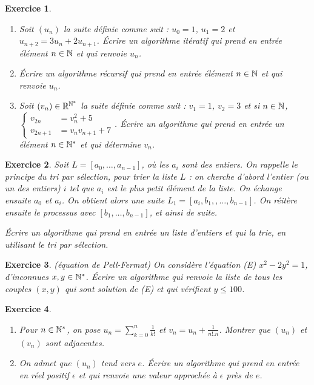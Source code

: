 \documentclass[11pt,a4paper]{article}
\newtheorem{ex}{Exercice}
\begin{document}
\begin{ex}\label{exSuite_recurrente}
\begin{enumerate}
\item Soit $(u_n)$ la suite définie comme suit : $u_0=1$, $u_1=2$ et $u_{n+2}=3u_n+2u_{n+1}$. Écrire un algorithme itératif qui prend en entrée élément $n\in \mathbb{N}$ et qui renvoie $u_n$.

\item Écrire un algorithme récursif qui prend en entrée élément $n\in \mathbb{N}$ et qui renvoie $u_n$.

\item Soit $(v_n)\in \mathbb{R}^{\mathbb{N}^*}$ la suite définie comme suit : $v_1=1$, $v_2=3$ et si $n\in \mathbb{N}$,  $\left\{\begin{aligned} v_{2n}&= v_n^2+5 \\
v_{2n+1}&= 
 v_n v_{n+1}+7 \end{aligned}\right.$. Écrire un algorithme qui prend en entrée un élément $n\in \mathbb{N}^*$ et qui  détermine $v_n$. 
\end{enumerate} 
\end{ex}

 

\begin{ex}\label{exTri_selection}
Soit $L=[a_0,\ldots,a_{n-1}]$, où les $a_i$ sont des entiers.  On rappelle le principe du tri par sélection, pour trier la liste $L$ : 
on cherche d'abord l'entier (ou un des entiers) $i$ tel que  $a_i$ est le plus petit élément de la liste. On échange ensuite $a_0$ et $a_i$. On obtient alors une suite $L_1=[a_i,b_1,,\ldots,b_{n-1}]$.  On réitère ensuite le processus avec $[b_1,\ldots,b_{n-1}]$, et ainsi de suite.

Écrire un algorithme qui prend en entrée un liste d'entiers et qui la trie, en utilisant le tri par sélection.
\end{ex}



\begin{ex}\label{eqPell-fermat}(équation de Pell-Fermat)
On considère l'équation (E) $x^2-2y^2=1$, d'inconnues $x,y\in \mathbb{N}^*$. Écrire un algorithme qui renvoie la liste de tous les couples $(x,y)$ qui sont solution de (E) et qui vérifient $y\leq 100$. 
\end{ex}




\begin{ex}\label{exSuite_e}
\begin{enumerate}
\item Pour $n\in \mathbb{N}^*$, on pose $u_n=\sum_{k=0}^n \frac{1}{k!}$ et $v_n=u_n+\frac{1}{n!.n}$. Montrer que $(u_n)$ et $(v_n)$ sont adjacentes.

\item On admet que $(u_n)$ tend vers $e$. Écrire un algorithme qui prend en entrée en réel positif $\epsilon$ et qui renvoie une valeur approchée à $\epsilon$ près de $e$. 
\end{enumerate}
\end{ex}
\end{document}
